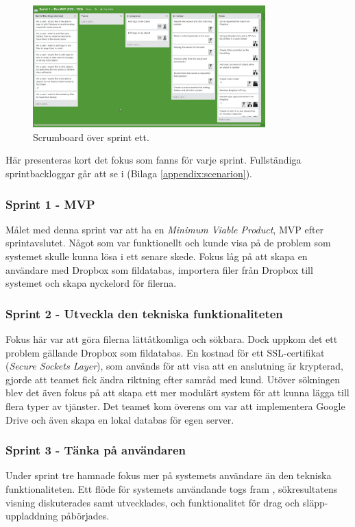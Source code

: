 \begin{figure}[!H]
\centering
\includegraphics[width=0.8\textwidth]{figures/trello.png}
\caption{Scrumboard över sprint ett.}
\label{fig:trello}
\end{figure}

Här presenteras kort det fokus som fanns för varje sprint. Fullständiga sprintbackloggar går att se i (Bilaga \ref{appendix:scenarion}).

\subsubsection{Sprint 1 - MVP}
Målet med denna sprint var att ha en \textit{Minimum Viable Product}, MVP\cite{mvp} efter sprintavslutet. Något som var funktionellt och kunde visa på de problem som systemet skulle kunna lösa i ett senare skede. Fokus låg på att skapa en användare med Dropbox som fildatabas, importera filer från Dropbox till systemet och skapa nyckelord för filerna.

\subsubsection{Sprint 2 - Utveckla den tekniska funktionaliteten}
Fokus här var att göra filerna lättåtkomliga och sökbara. Dock uppkom det ett problem gällande Dropbox som fildatabas. En kostnad för ett SSL-certifikat (\textit{Secure Sockets Layer}), som används för att visa att en anslutning är krypterad, gjorde att teamet fick ändra riktning efter samråd med kund. Utöver sökningen blev det även fokus på att skapa ett mer modulärt system för att kunna lägga till flera typer av tjänster. Det teamet kom överens om var att implementera Google Drive och även skapa en lokal databas för egen server.

\subsubsection{Sprint 3 - Tänka på användaren}
Under sprint tre hamnade fokus mer på systemets användare än den tekniska funktionaliteten. Ett flöde för systemets användande togs fram , sökresultatens visning diskuterades samt utvecklades, och funktionalitet för drag och släpp-uppladdning påbörjades.

